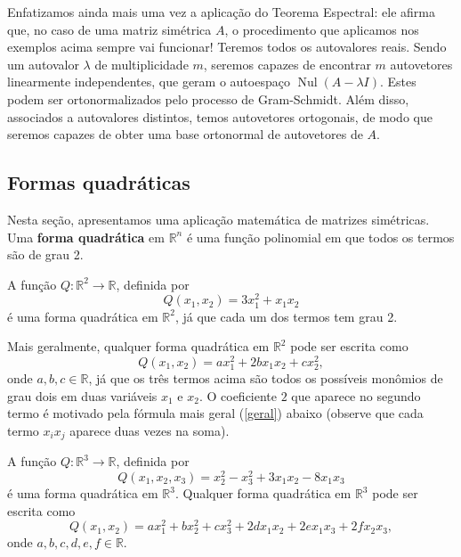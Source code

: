 Enfatizamos ainda mais uma vez a aplicação do Teorema Espectral: ele afirma que, no caso de uma matriz simétrica $A$, o procedimento que aplicamos nos exemplos acima sempre vai funcionar! Teremos todos os autovalores reais. Sendo um autovalor $\lambda$ de multiplicidade $m$, seremos capazes de encontrar $m$ autovetores linearmente independentes, que geram o autoespaço $\operatorname{Nul} (A - \lambda I)$. Estes podem ser ortonormalizados pelo processo de Gram-Schmidt. Além disso, associados a autovalores distintos, temos autovetores ortogonais, de modo que seremos capazes de obter uma base ortonormal de autovetores de $A$.


\subsection{Formas quadráticas}


Nesta seção, apresentamos uma aplicação matemática de matrizes simétricas. Uma \textbf{forma quadrática} em $\mathbb{R}^n$ é uma função polinomial em que todos os termos são de grau 2.

\begin{ex}\label{exemplo1}
	A função $Q : \mathbb{R}^2 \to \mathbb{R}$, definida por
	\begin{equation}
	Q(x_1, x_2) = 3 x_1^2 + x_1x_2
	\end{equation} é uma forma quadrática em $\mathbb{R}^2$, já que cada um dos termos tem grau 2.

	Mais geralmente, qualquer forma quadrática em $\mathbb{R}^2$ pode ser escrita como
	\begin{equation}
	Q(x_1, x_2) = a x_1^2 + 2 b x_1x_2 + cx_2^2,
	\end{equation} onde $a,b,c \in \mathbb{R}$, já que os três termos acima são todos os possíveis monômios de grau dois em duas variáveis $x_1$ e $x_2$. O coeficiente $2$ que aparece no segundo termo é motivado pela fórmula mais geral (\ref{geral}) abaixo (observe que cada termo $x_i x_j$ aparece duas vezes na soma).
\end{ex}




\begin{ex}\label{exemplo2}
	A função $Q : \mathbb{R}^3 \to \mathbb{R}$, definida por
	\begin{equation}
	Q(x_1, x_2, x_3) = x_2^2 - x_3^2 + 3 x_1 x_2 - 8 x_1 x_3
	\end{equation} é uma forma quadrática em $\mathbb{R}^3$. Qualquer forma quadrática em $\mathbb{R}^3$ pode ser escrita como
	\begin{equation}
	Q(x_1, x_2) = a x_1^2 + b x_2^2 + cx_3^2 + 2 dx_1x_2 +2  ex_1x_3 +2  fx_2x_3,
	\end{equation} onde $a,b,c, d, e, f \in \mathbb{R}$.
\end{ex}



